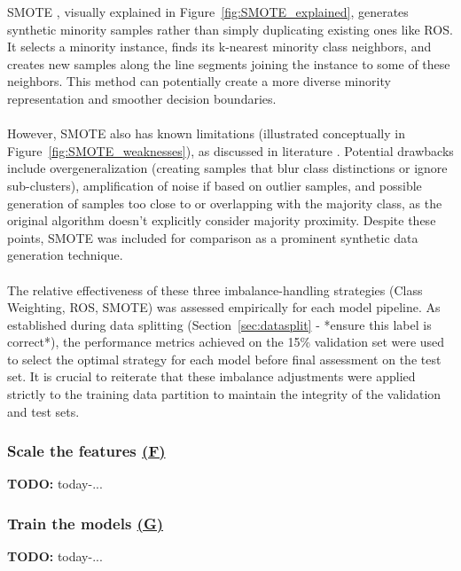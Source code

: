 \documentclass[12pt,a4paper]{report}
\newcommand{\todo}[1]{%
  \par\noindent%
  \begin{tcolorbox}[colback=yellow, colframe=black, boxrule=0.5pt, sharp corners, width=\linewidth, before skip=5pt, after skip=5pt]
    \textbf{TODO:} #1
  \end{tcolorbox}%
  \par
}
\begin{document}
\noindent %
SMOTE \cite{Chawla2002SMOTE}, visually explained in Figure~\ref{fig:SMOTE_explained}, generates synthetic minority samples rather than simply duplicating existing ones like ROS. It selects a minority instance, finds its k-nearest minority class neighbors, and creates new samples along the line segments joining the instance to some of these neighbors. This method can potentially create a more diverse minority representation and smoother decision boundaries.\\
\\
However, SMOTE also has known limitations (illustrated conceptually in Figure~\ref{fig:SMOTE_weaknesses}), as discussed in literature \cite{Truong2022SMOTEVariants}. Potential drawbacks include overgeneralization (creating samples that blur class distinctions or ignore sub-clusters), amplification of noise if based on outlier samples, and possible generation of samples too close to or overlapping with the majority class, as the original algorithm doesn't explicitly consider majority proximity. Despite these points, SMOTE was included for comparison as a prominent synthetic data generation technique.\\
\\
The relative effectiveness of these three imbalance-handling strategies (Class Weighting, ROS, SMOTE) was assessed empirically for each model pipeline. As established during data splitting (Section~\ref{sec:datasplit} - *ensure this label is correct*), the performance metrics achieved on the 15\% validation set were used to select the optimal strategy for each model before final assessment on the test set. It is crucial to reiterate that these imbalance adjustments were applied strictly to the training data partition to maintain the integrity of the validation and test sets.









\subsubsection*{Scale the features \hyperref[fig:pipeline-1]{(F)}}
\todo{today-...}

\subsubsection*{Train the models \hyperref[fig:pipeline-1]{(G)}}
\todo{today-...}
\end{document}
